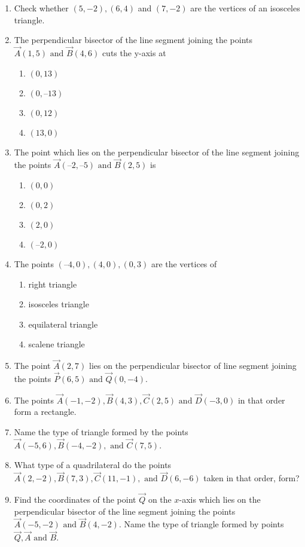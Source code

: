 \begin{enumerate}[label=\thesubsection.\arabic*, ref=\thesubsection.\theenumi]
	\\
		
\item Check whether $(5, -2),  (6, 4)$ and $(7, -2)$ are the vertices of an isosceles triangle.
\item The perpendicular bisector of the line segment joining the points $\vec{A} (1,  5) \text{ and }
\vec{B} (4,  6)$ cuts the y-axis at
\begin{enumerate}
	\item$(0,  13)$ 
	\item $(0,  –13)$
	\item$(0,  12) $
	\item$(13,  0)$
\end{enumerate}
\item The point which lies on the perpendicular bisector of the line segment joining the
	points $\vec{A} (–2,  –5)\text { and } \vec{B} (2,  5) $ is
\begin{enumerate}
\item  	$(0,  0)$
\item  $(0,  2)$ 
\item  $(2,  0)$ 
\item  $(–2,  0)$
\end{enumerate}
\item The points $ (–4,  0),  (4,  0),  (0,  3) $ are the vertices of
	\begin{enumerate}
\item right triangle 
\item isosceles triangle
\item  equilateral triangle
\item  scalene triangle 
\end{enumerate}
\item The point $\vec{A}(2, 7)$ lies on the perpendicular bisector of line segment joining the points $\vec{P}(6, 5)\text{ and } \vec{Q}(0, -4)$.
\item The points $\vec{A}(-1, -2),  \vec{B}(4, 3),  \vec{C}(2, 5) \text{ and } \vec{D}(-3, 0)$ in that order form a rectangle.
\item Name the type of triangle formed by the points $\vec{A}(-5, 6), \vec{B}(-4, -2), \text{ and }\vec{C}(7, 5)$.
\item What type of a quadrilateral do the points $\vec{A}(2, -2), \vec{B}(7, 3), \vec{C}(11, -1), \text{ and }\vec{D}(6, -6)$ taken in that order,  form?
\item Find the coordinates of the point $\vec{Q}$ on the $x$-axis which lies on the perpendicular bisector of the line segment joining the points $\vec{A}(-5, -2) \text{ and } \vec{B}(4, -2)$. Name the type of triangle formed by points $\vec{Q}, \vec{A}\text{ and }\vec{B}$.

\end{enumerate}
